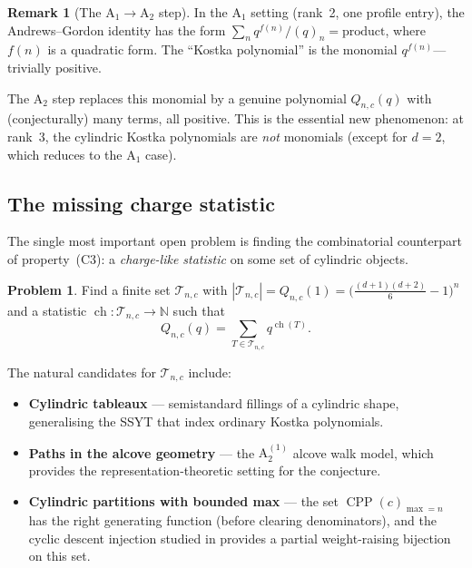 \documentclass[11pt]{article}
\theoremstyle{plain}
\theoremstyle{definition}
\newtheorem{remark}[theorem]{Remark}
\newtheorem{problem}[theorem]{Problem}
\newcommand{\N}{\mathbb{N}}
\newcommand{\CPP}{\operatorname{CPP}}
\begin{document}
\begin{remark}[The $\mathrm{A}_1 \to \mathrm{A}_2$ step]
In the $\mathrm{A}_1$ setting (rank~2, one profile entry), the
Andrews--Gordon identity has the form
$\sum_n q^{f(n)}/(q)_n = \text{product}$, where $f(n)$ is a
quadratic form.  The ``Kostka polynomial'' is the monomial
$q^{f(n)}$---trivially positive.

The $\mathrm{A}_2$ step replaces this monomial by a genuine
polynomial $Q_{n,c}(q)$ with (conjecturally) many terms, all
positive.  This is the essential new phenomenon: at rank~3,
the cylindric Kostka polynomials are \emph{not} monomials
(except for $d = 2$, which reduces to the $\mathrm{A}_1$ case).
\end{remark}

\subsection{The missing charge statistic}

The single most important open problem is finding the combinatorial
counterpart of property~(C3): a \emph{charge-like statistic} on some
set of cylindric objects.

\begin{problem}
\label{prob:charge}
Find a finite set $\mathcal{T}_{n,c}$ with
$|\mathcal{T}_{n,c}| = Q_{n,c}(1)
= \bigl(\frac{(d+1)(d+2)}{6} - 1\bigr)^n$ and a statistic
$\operatorname{ch}\colon \mathcal{T}_{n,c} \to \N$ such that
\begin{equation}
  Q_{n,c}(q) = \sum_{T \in \mathcal{T}_{n,c}} q^{\operatorname{ch}(T)}.
  \label{eq:charge-formula}
\end{equation}
\end{problem}

The natural candidates for $\mathcal{T}_{n,c}$ include:
\begin{itemize}
  \item \textbf{Cylindric tableaux} --- semistandard fillings of a
    cylindric shape, generalising the SSYT that index ordinary Kostka
    polynomials.
  \item \textbf{Paths in the alcove geometry} --- the $\mathrm{A}_2^{(1)}$
    alcove walk model, which provides the representation-theoretic
    setting for the conjecture.
  \item \textbf{Cylindric partitions with bounded max} --- the set
    $\CPP(c)_{\max = n}$ has the right generating function (before
    clearing denominators), and the cyclic descent injection studied
    in \cite{Langer-thesis} provides a partial weight-raising
    bijection on this set.
\end{itemize}
\end{document}
